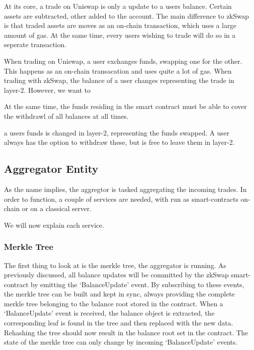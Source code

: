 \documentclass[../../thesis.tex]{subfiles}
\begin{document}
At its core, a trade on Uniswap is only a update to a users balance. Certain assets are subtracted, other added to the account. The main difference to zkSwap is that traded assets are moves as an on-chain transaction, which uses a large amount of gas. At the same time, every users wishing to trade will do so in a seperate transaction. 


When trading on Uniswap, a user exchanges funds, swapping one for the other. This happens as an on-chain transacation and uses quite a lot of gas. When trading with zkSwap, the balance of a user changes representing the trade in layer-2. However, we want to


At the same time, the funds residing in the smart contract must be able to cover the withdrawl of all balances at all times. 



a users funds is changed in layer-2, representing the funds swapped. A user always has the option to withdraw these, but is free to leave them in layer-2. 

\subsection{Aggregator Entity}
As the name implies, the aggregtor is tasked aggregating the incoming trades. In order to function, a couple of services are needed, with run as smart-contracts on-chain or on a classical server. 

We will now explain each service.

\subsubsection{Merkle Tree}
The first thing to look at is the merkle tree, the aggregator is running. As previously discussed, all balance updates will be committed by the zkSwap smart-contract by emitting the `BalanceUpdate' event. By subscribing to these events, the merkle tree can be built and kept in sync, always providing the complete merkle tree belonging to the balance root stored in the contract. When a `BalanceUpdate' event is received, the balance object is extracted, the corresponding leaf is found in the tree and then replaced with the new data. Rehashing the tree should now result in the balance root set in the contract. The state of the merkle tree can only change by incoming `BalanceUpdate' events.
\end{document}
